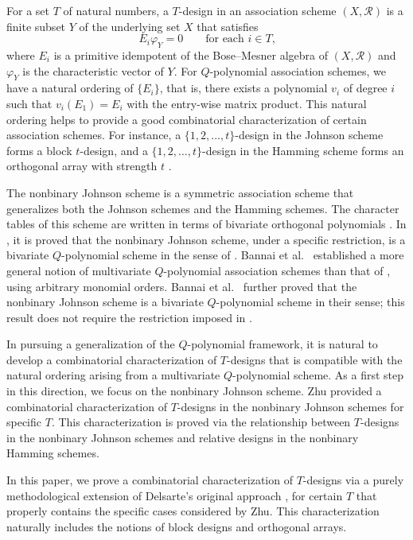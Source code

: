 \documentclass[a4paper, 11pt]{article}
\theoremstyle{definition}
\begin{document}
For a set $T$ of natural numbers, a $T$-design in an association scheme $(X,\mathcal{R})$ is a finite subset $Y$ of the underlying set $X$ that satisfies
\[
E_i \varphi_Y = 0 \qquad \text{for each $i \in T$,}
\]
where $E_i$ is a primitive idempotent of the Bose--Mesner algebra of $(X,\mathcal{R})$ and $\varphi_Y$ is the characteristic vector of $Y$.
For $Q$-polynomial association schemes, we have a natural ordering of $\{E_i\}$, that is, there exists a polynomial $v_i$ of degree $i$ such that $v_i(E_1) = E_i$ with the entry-wise matrix product. 
This natural ordering helps to provide a good combinatorial characterization of certain association schemes. 
For instance, a $\{1,2,\ldots,t\}$-design in the Johnson scheme forms a block $t$-design, and a $\{1,2,\ldots,t\}$-design in the Hamming scheme forms an orthogonal array with strength $t$ \cite{D73}.

The nonbinary Johnson scheme is a symmetric association scheme that generalizes both the Johnson 
schemes and the Hamming schemes. 
The character tables of this scheme are written in terms of bivariate orthogonal polynomials 
\cite{Dun76, TAG85}. 
In \cite{CVZZ24}, it is proved that the nonbinary Johnson scheme, under a specific restriction, 
is a bivariate $Q$-polynomial scheme in the sense of \cite{BCPVZ24}. 
Bannai et al.\ \cite{BKZZ25} established a more general notion of multivariate 
$Q$-polynomial association schemes than that of \cite{CVZZ24}, using arbitrary monomial orders. 
Bannai et al.\ \cite{BKZZ24} further proved that the nonbinary Johnson scheme is a bivariate 
$Q$-polynomial scheme in their sense; this result does not require the restriction imposed 
in \cite{CVZZ24}. 

In pursuing a generalization of the $Q$-polynomial framework, it is natural to develop a 
combinatorial characterization of $T$-designs that is compatible with the natural ordering arising from a 
multivariate $Q$-polynomial scheme. 
As a first step in this direction, we focus on the nonbinary Johnson scheme.  
Zhu \cite{Z21} provided a combinatorial characterization of $T$-designs in the nonbinary Johnson 
schemes for specific $T$. 
This characterization is proved via the relationship between $T$-designs in the nonbinary Johnson 
schemes and relative designs in the nonbinary Hamming schemes.


In this paper, we prove a combinatorial characterization of $T$-designs via a purely 
methodological extension of Delsarte's original approach \cite{D73}, for certain $T$ that 
properly contains the specific cases considered by Zhu. 
This characterization naturally includes the notions of block designs and orthogonal arrays. 
\end{document}

